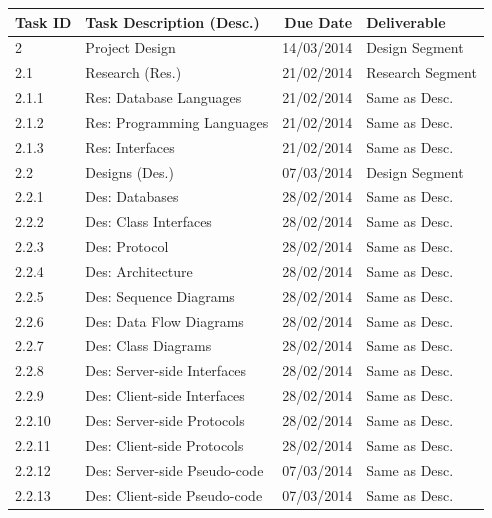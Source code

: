 \begin{tabular}{llrl}
    \bottomrule
    
\end{tabular}

\pagebreak

\begin{tabular}{llrl}
    
    \toprule
    
    Task ID  & Task Description (Desc.)     & Due Date    & Deliverable       \\
    
    \midrule
    
    2        & Project Design               & 14/03/2014  & Design Segment    \\
    
    \cmidrule(r){2-3}
    2.1      & Research (Res.)              & 21/02/2014  & Research Segment  \\
    2.1.1    & Res: Database Languages      & 21/02/2014  & Same as Desc.     \\
    2.1.2    & Res: Programming Languages   & 21/02/2014  & Same as Desc.     \\
    2.1.3    & Res: Interfaces              & 21/02/2014  & Same as Desc.     \\
    \cmidrule(r){2-3}
    
    2.2      & Designs (Des.)               & 07/03/2014  & Design Segment    \\
    2.2.1    & Des: Databases               & 28/02/2014  & Same as Desc.     \\
    2.2.2    & Des: Class Interfaces        & 28/02/2014  & Same as Desc.     \\
    2.2.3    & Des: Protocol                & 28/02/2014  & Same as Desc.     \\
    2.2.4    & Des: Architecture            & 28/02/2014  & Same as Desc.     \\
    2.2.5    & Des: Sequence Diagrams       & 28/02/2014  & Same as Desc.     \\
    2.2.6    & Des: Data Flow Diagrams      & 28/02/2014  & Same as Desc.     \\
    2.2.7    & Des: Class Diagrams          & 28/02/2014  & Same as Desc.     \\
    2.2.8    & Des: Server-side Interfaces  & 28/02/2014  & Same as Desc.     \\
    2.2.9    & Des: Client-side Interfaces  & 28/02/2014  & Same as Desc.     \\
    2.2.10   & Des: Server-side Protocols   & 28/02/2014  & Same as Desc.     \\
    2.2.11   & Des: Client-side Protocols   & 28/02/2014  & Same as Desc.     \\
    2.2.12   & Des: Server-side Pseudo-code & 07/03/2014  & Same as Desc.     \\
    2.2.13   & Des: Client-side Pseudo-code & 07/03/2014  & Same as Desc.     \\
    \cmidrule(r){2-3}
    

\end{tabular}
